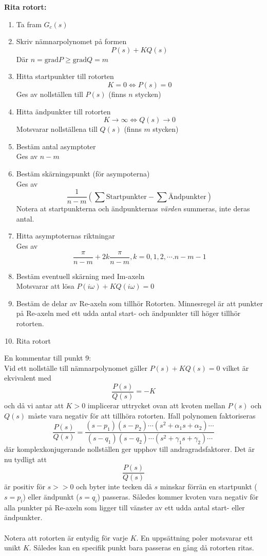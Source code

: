 \documentclass[12pt]{article}
\begin{document}
\textbf{Rita rotort:}
\begin{enumerate}
\item Ta fram $G_c(s)$
\item Skriv nämnarpolynomet på formen
\[P(s) + KQ(s)\]
Där $n = \mathrm{grad}{P} \geq \mathrm{grad}{Q} = m$
\item Hitta startpunkter till rotorten
\[K = 0 \Leftrightarrow P(s) = 0\]
Ges av nollställen till $P(s)$ (finns $n$ stycken)
\item Hitta ändpunkter till rotorten
\[K \to \infty \Leftrightarrow Q(s) \to 0\]
Motsvarar nollställena till $Q(s)$ (finns $m$ stycken)
\item Bestäm antal asymptoter \\
Ges av $n-m$
\item Bestäm skärningspunkt (för asympoterna) \\
Ges av 
\[\frac{1}{n-m}\left(\sum \text{Startpunkter} - \sum \text{Ändpunkter}\right)\]
Notera at startpunkterna och ändpunkternas \emph{värden} summeras, inte deras antal.
\item Hitta asymptoternas riktningar \\
Ges av
\[\frac{\pi}{n-m} + 2k\frac{\pi}{n-m}, k = 0,1,2,\cdots. n-m-1\]
\item Bestäm eventuell skärning med Im-axeln \\
Motsvarar att lösa $P(i\omega) + KQ(i\omega) = 0$
\item Bestäm de delar av Re-axeln som tillhör Rotorten. Minnesregel är att punkter på Re-axeln med ett udda antal start- och ändpunkter till höger tillhör rotorten.
\item Rita rotort
\end{enumerate}
En kommentar till punkt 9: \\
Vid ett nollställe till nämnarpolynomet gäller $P(s) + KQ(s) = 0$ vilket är ekvivalent med
\[\frac{P(s)}{Q(s)} = -K\]
och då vi antar att $K > 0$ implicerar uttrycket ovan att kvoten mellan $P(s)$ och $Q(s)$ måste vara negativ för att tillhöra rotorten. Ifall polynomen faktoriseras 
\[\frac{P(s)}{Q(s)} = \frac{(s-p_1)(s-p_2)\cdots(s^2+\alpha_1s + \alpha_2)\cdots}{(s-q_1)(s-q_2)\cdots(s^2+\gamma_1s+\gamma_2)\cdots} \]
där komplexkonjugerande nollställen ger upphov till andragradsfaktorer. Det är nu tydligt att 
\[\frac{P(s)}{Q(s)}\]
är positiv för $s >> 0$ och byter inte tecken då $s$ minskar förrän en startpunkt ($s = p_i$) eller ändpunkt ($s = q_i$) passeras. Således kommer kvoten vara negativ för alla punkter på Re-axeln som ligger till vänster av ett udda antal start- eller ändpunkter.\\\\
Notera att rotorten är entydig för varje $K$. En uppsättning poler motsvarar ett unikt $K$. Således kan en specifik punkt bara passeras en gång då rotorten ritas.
\end{document}
